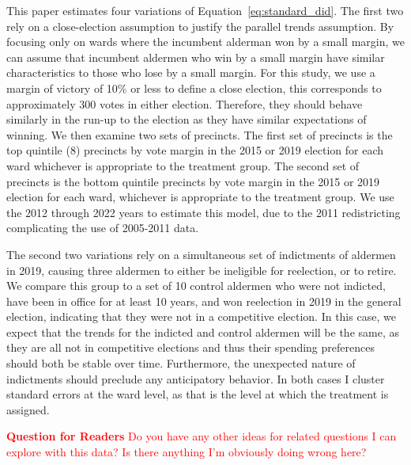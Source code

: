 This paper estimates four variations of Equation~\ref{eq:standard_did}. 
The first two rely on a close-election assumption to justify the parallel trends assumption. 
By focusing only on wards where the incumbent alderman won by a small margin, we can assume that incumbent aldermen who win by a small margin have similar characteristics to those who lose by a small margin.
For this study, we use a margin of victory of 10\% or less to define a close election, this corresponds to approximately 300 votes in either election.
Therefore, they should behave similarly in the run-up to the election as they have similar expectations of winning.
We then examine two sets of precincts. 
The first set of precincts is the top quintile (8) precincts by vote margin in the 2015 or 2019 election for each ward whichever is appropriate to the treatment group. 
The second set of precincts is the bottom quintile precincts by vote margin in the 2015 or 2019 election for each ward, whichever is appropriate to the treatment group.
We use the 2012 through 2022 years to estimate this model, due to the 2011 redistricting complicating the use of 2005-2011 data. 

The second two variations rely on a simultaneous set of indictments of aldermen in 2019, causing three aldermen to either be ineligible for reelection, or to retire. 
We compare this group to a set of 10 control aldermen who were not indicted, have been in office for at least 10 years, and won reelection in 2019 in the general election, indicating that they were not in a competitive election. 
In this case, we expect that the trends for the indicted and control aldermen will be the same, as they are all not in competitive elections and thus their spending preferences should both be stable over time.
Furthermore, the unexpected nature of indictments should preclude any anticipatory behavior.
In both cases I cluster standard errors at the ward level, as that is the level at which the treatment is assigned.

\textcolor{red}{\textbf{Question for Readers} Do you have any other ideas for related questions I can explore with this data? Is there anything I'm obviously doing wrong here?}
